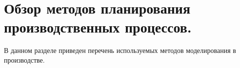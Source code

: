 




\section{Обзор методов планирования производственных процессов.}

В данном разделе приведен перечень используемых методов моделирования в производстве.

